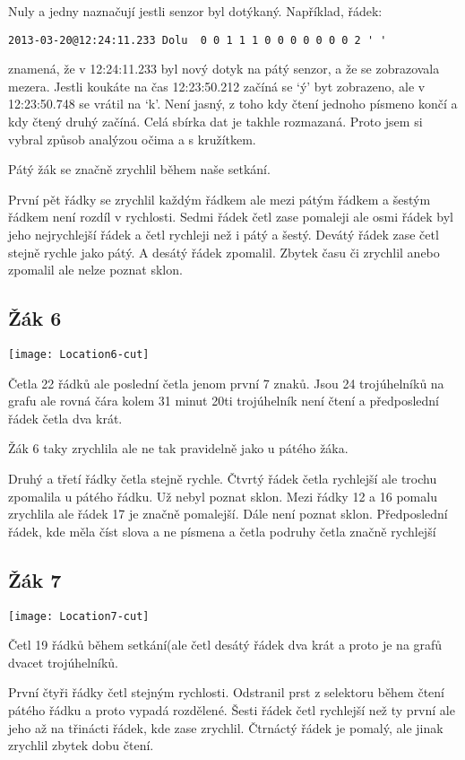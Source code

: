 Nuly a jedny naznačují jestli senzor byl dotýkaný. Například, řádek:
\begin{verbatim}
2013-03-20@12:24:11.233 Dolu  0 0 1 1 1 0 0 0 0 0 0 0 2 ' '
\end{verbatim}

znamená, že v 12:24:11.233 byl nový dotyk na pátý senzor, a že se zobrazovala mezera.  Jestli koukáte na čas 12:23:50.212 začíná se `ý' byt zobrazeno, ale v 12:23:50.748 se vrátil na `k'.  Není jasný, z toho kdy čtení jednoho písmeno končí a kdy čtený druhý začíná.  Celá sbírka dat je takhle rozmazaná.  Proto jsem si vybral způsob analýzou očima a s kružítkem.

Pátý žák se značně zrychlil během naše setkání.

První pět řádky se zrychlil každým řádkem ale mezi pátým řádkem a šestým řádkem není rozdíl v rychlosti. Sedmi řádek četl zase pomaleji ale osmi řádek byl jeho nejrychlejší řádek a četl rychleji než i pátý a šestý.  Devátý řádek zase četl stejně rychle jako pátý.  A desátý řádek zpomalil.  Zbytek času či zrychlil anebo zpomalil ale nelze poznat sklon.

\subsection{Žák 6}
\texttt{[image: Location6-cut]}

Četla 22 řádků ale poslední četla jenom první 7 znaků.  Jsou 24 trojúhelníků na grafu ale rovná čára kolem 31 minut 20ti trojúhelník není čtení a předposlední řádek četla dva krát.

Žák 6 taky zrychlila ale ne tak pravidelně jako u pátého žáka.

Druhý a třetí řádky četla stejně rychle.  Čtvrtý řádek četla rychlejší ale trochu zpomalila u pátého řádku. Už nebyl poznat sklon.  Mezi řádky 12 a 16 pomalu zrychlila ale řádek 17 je značně pomalejší.  Dále není poznat sklon.  Předposlední řádek, kde měla číst slova a ne písmena a četla podruhy četla značně rychlejší

\subsection{Žák 7}
\texttt{[image: Location7-cut]}

Četl 19 řádků během setkání(ale četl desátý řádek dva krát a proto je na grafů dvacet trojúhelníků.

První čtyři řádky četl stejným rychlosti.  Odstranil prst z selektoru během čtení pátého řádku a proto vypadá rozdělené. Šesti řádek četl rychlejší než ty první ale jeho až na třinácti řádek, kde zase zrychlil.  Čtrnáctý řádek je pomalý, ale jinak zrychlil zbytek dobu čtení.


